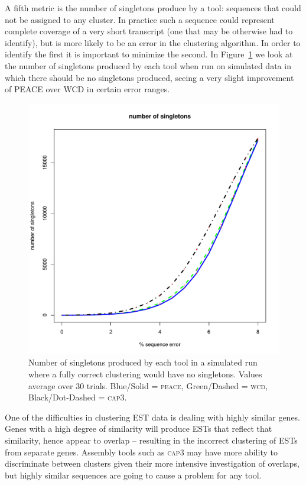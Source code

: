 \documentclass[a4paper,12pt]{article}
\newcommand{\mc}[1]{#1}   %
\begin{document}
\begin{appendix}
\mc{A fifth metric is the number of singletons produce by a
  tool:  sequences that  could not  be  assigned to  any cluster.   In
  practice such a sequence could represent complete coverage of a very
  short transcript (one that may be otherwise had to identify), but is
  more likely to be an error in the clustering algorithm.  In order to
  identify  the first  it is  important  to minimize  the second.   In
  Figure~\ref{singletons} we look at the number of singletons produced
  by each tool when run on  simulated data in which there should be no
  singletons produced,  seeing a very slight improvement  of PEACE over
  WCD in certain error ranges.}

\begin{figure}[tbp]
\centerline{
\includegraphics[scale=0.35]{pics.d/singletons_40.pdf}
}
\caption{Number of singletons produced by each tool in a simulated run
  where a fully correct clustering would have no singletons.  Values
  average over 30 trials.  Blue/Solid = \textsc{peace}, Green/Dashed =
  \textsc{wcd}, Black/Dot-Dashed = \textsc{cap3}.}\label{singletons}
\end{figure}


One of the difficulties in clustering EST data is dealing with
highly similar genes.  Genes with a high degree of similarity will
produce ESTs that reflect that similarity, hence appear to overlap --
resulting in the incorrect clustering of ESTs from separate genes.  Assembly tools
such as \textsc{cap3} may have more ability to discriminate between clusters
given their more intensive investigation of overlaps, but highly
similar sequences are going to cause a problem for any tool. 


\end{appendix}
\end{document}
